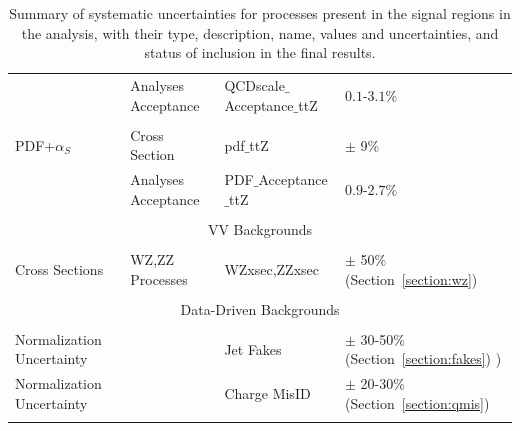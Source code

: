 \begin{table}[htbp]
\begin{center}
{\begin{tabular}{|llll|}
                                            & Analyses Acceptance &    QCDscale$\_$Acceptance$\_$ttZ             &    $0.1$-$3.1\%$          \\
         & &  &               \\
      PDF+$\alpha_S$     &   Cross Section  &    pdf$\_$ttZ         &     $\pm$ 9$\%$       \\
                                      &   Analyses Acceptance  &    PDF$\_$Acceptance$\_$ttZ         &     $0.9$-$2.7\%$      \\
         & &  &               \\
     \hline
      \multicolumn{4}{|c|}{VV Backgrounds}\\
     \hline
         &   & &              \\
      Cross Sections             &   WZ,ZZ Processes       &    WZxsec,ZZxsec        &     $\pm$ 50$\%$   (Section~\ref{section:wz})   \\
          &  &  &             \\
     \hline
      \multicolumn{4}{|c|}{Data-Driven Backgrounds}\\
     \hline
          &  &  &             \\
           Normalization Uncertainty                 &         &    Jet Fakes       &     $\pm$ 30-50$\%$ (Section~\ref{section:fakes})  )   \\
           Normalization Uncertainty                 &         &    Charge MisID    &     $\pm$ 20-30$\%$ (Section~\ref{section:qmis})      \\
          &  &  &             \\
     \hline
    \end{tabular}
    }
    \caption{ Summary of systematic uncertainties for processes present in the signal regions in the analysis, with their
    type, description, name, values and uncertainties, and status of inclusion in the final results.}
    \label{table:systematics_summary}
    \end{center}
    \end{table} 


